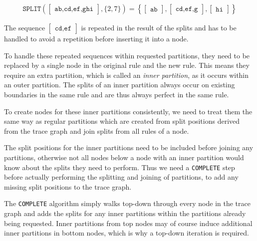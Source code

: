 \begin{align*}
    \texttt{SPLIT}(
\begin{bmatrix}
    \texttt{ab,cd,ef,ghi}
\end{bmatrix}
, \{2, 7\}) = \left\{
\begin{bmatrix}
    \texttt{ab}
\end{bmatrix}
,
\begin{bmatrix}
    \texttt{cd,ef,g}
\end{bmatrix},
\begin{bmatrix}
    \texttt{hi}
\end{bmatrix}
\right\}
\end{align*}

The sequence $\begin{bmatrix}\texttt{cd,ef}\end{bmatrix}$ is repeated in the result of the splits and has to be handled to avoid a repetition before inserting it into a node.

To handle these repeated sequences within requested partitions, they need to be replaced by a single node in the original rule and the new rule. This means they require an extra partition, which is called an \textit{inner partition}, as it occurs within an outer partition. The splits of an inner partition always occur on existing boundaries in the same rule and are thus always perfect in the same rule.

To create nodes for these inner partitions consistently, we need to treat them the same way as regular partitions which are created from split positions derived from the trace graph and join splits from all rules of a node.

The split positions for the inner partitions need to be included before joining any partitions, otherwise not all nodes below a node with an inner partition would know about the splits they need to perform. Thus we need a \texttt{COMPLETE} step before actually performing the splitting and joining of partitions, to add any missing split positions to the trace graph.

The \texttt{COMPLETE} algorithm simply walks top-down through every node in the trace graph and adds the splits for any inner partitions within the partitions already being requested. Inner partitions from top nodes may of course induce additional inner partitions in bottom nodes, which is why a top-down iteration is required.


